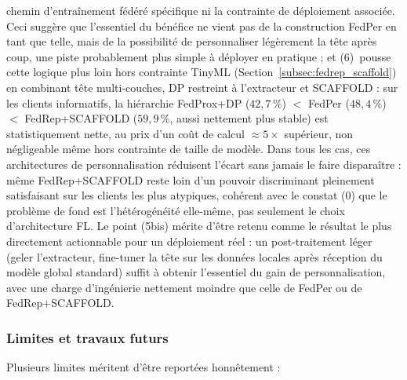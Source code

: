 \documentclass{article}
\begin{document}
chemin d'entraînement fédéré spécifique ni la contrainte de déploiement associée. Ceci
suggère que l'essentiel du bénéfice ne vient pas de la construction FedPer en tant que
telle, mais de la possibilité de personnaliser légèrement la tête après coup, une
piste probablement plus simple à déployer en pratique ; et (6)~pousse cette logique
plus loin hors contrainte TinyML (Section~\ref{subsec:fedrep_scaffold}) en
combinant tête multi-couches, DP restreint à l'extracteur et SCAFFOLD : sur les clients
informatifs, la hiérarchie FedProx+DP ($42{,}7\,\%$) $<$ FedPer ($48{,}4\,\%$) $<$
FedRep+SCAFFOLD ($59{,}9\,\%$, aussi nettement plus stable) est statistiquement nette,
au prix d'un coût de calcul $\approx 5\times$ supérieur, non négligeable même hors
contrainte de taille de modèle. Dans tous les cas, ces architectures de
personnalisation réduisent l'écart sans jamais le faire disparaître : même
FedRep+SCAFFOLD reste loin d'un pouvoir discriminant pleinement satisfaisant sur les
clients les plus atypiques, cohérent avec le constat (0) que le problème de fond est
l'hétérogénéité elle-même, pas seulement le choix d'architecture FL. Le point (5bis)
mérite d'être retenu comme le résultat le plus directement actionnable pour un
déploiement réel : un post-traitement léger (geler l'extracteur, fine-tuner la tête sur
les données locales après réception du modèle global standard) suffit à obtenir
l'essentiel du gain de personnalisation, avec une charge d'ingénierie nettement moindre
que celle de FedPer ou de FedRep+SCAFFOLD.

\subsubsection{Limites et travaux futurs}
\label{subsec:synthesis_limits}

Plusieurs limites méritent d'être reportées honnêtement :
\end{document}
